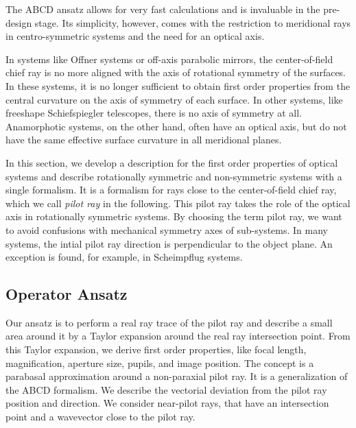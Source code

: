 \documentclass[12pt,a4paper,twoside,openright,BCOR10mm,headsepline,titlepage,abstracton,chapterprefix,final]{scrreprt}
\begin{document}
The ABCD ansatz allows for very fast calculations and is invaluable in the pre-design stage.
Its simplicity, however, comes with the restriction to meridional rays in centro-symmetric systems and the need for an optical axis.

In systems like Offner systems or off-axis parabolic mirrors, the center-of-field chief ray is no more aligned with the axis of rotational symmetry of the surfaces.
In these systems, it is no longer sufficient to obtain first order properties from the central curvature on the axis of symmetry of each surface.
In other systems, like freeshape Schiefspiegler telescopes, there is no axis of symmetry at all. 
Anamorphotic systems, on the other hand, often have an optical axis, but do not have the same effective surface curvature in all meridional planes.

In this section, we develop a description for the first order properties of optical systems 
and describe rotationally symmetric and non-symmetric systems with a single formalism.
It is a formalism for rays close to the center-of-field chief ray, which we call \emph{pilot ray} in the following.
This pilot ray takes the role of the optical axis in rotationally symmetric systems. 
By choosing the term pilot ray, we want to avoid confusions with mechanical symmetry axes of sub-systems.
In many systems, the intial pilot ray direction is perpendicular to the object plane. 
An exception is found, for example, in Scheimpflug systems.

\subsection{Operator Ansatz}
Our ansatz is to perform a real ray trace of the pilot ray and describe a small area around it by a Taylor expansion around the real ray intersection point.
From this Taylor expansion, we derive first order properties, like focal length, magnification, aperture size, pupils, and image position.
The concept is a parabasal approximation around a non-paraxial pilot ray.
It is a generalization of the ABCD formalism. 
We describe the vectorial deviation from the pilot ray position and direction.
We consider near-pilot rays, that have an intersection point and a wavevector close to the pilot ray.
\end{document}
